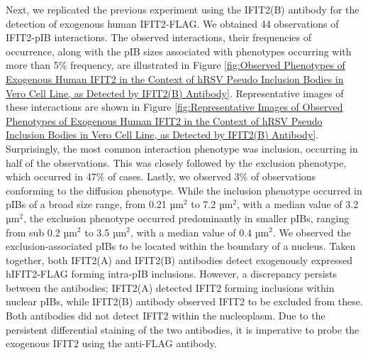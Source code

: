 Next, we replicated the previous experiment using the IFIT2(B) antibody for the detection of exogenous human IFIT2-FLAG. We obtained 44 observations of IFIT2-pIB interactions. The observed interactions, their frequencies of occurrence, along with the pIB sizes associated with phenotypes occurring with more than 5\% frequency, are illustrated in Figure \ref{fig:Observed Phenotypes of Exogenous Human IFIT2 in the Context of hRSV Pseudo Inclusion Bodies in Vero Cell Line, as Detected by IFIT2(B) Antibody}. Representative images of these interactions are shown in Figure \ref{fig:Representative Images of Observed Phenotypes of Exogenous Human IFIT2 in the Context of hRSV Pseudo Inclusion Bodies in Vero Cell Line, as Detected by IFIT2(B) Antibody}. Surprisingly, the most common interaction phenotype was inclusion, occurring in half of the observations. This was closely followed by the exclusion phenotype, which occurred in 47\% of cases. Lastly, we observed 3\% of observations conforming to the diffusion phenotype. While the inclusion phenotype occurred in pIBs of a broad size range, from 0.21 \(\mbox{µm}^2\) to 7.2 \(\mbox{µm}^2\), with a median value of 3.2 \(\mbox{µm}^2\), the exclusion phenotype occurred predominantly in smaller pIBs, ranging from sub 0.2 \(\mbox{µm}^2\) to 3.5 \(\mbox{µm}^2\), with a median value of 0.4 \(\mbox{µm}^2\). We observed the exclusion-associated pIBs to be located within the boundary of a nucleus. Taken together, both IFIT2(A) and IFIT2(B) antibodies detect exogenously expressed hIFIT2-FLAG forming intra-pIB inclusions. However, a discrepancy persists between the antibodies; IFIT2(A) detected IFIT2 forming inclusions within nuclear pIBs, while IFIT2(B) antibody observed IFIT2 to be excluded from these. Both antibodies did not detect IFIT2 within the nucleoplasm. Due to the persistent differential staining of the two antibodies, it is imperative to probe the exogenous IFIT2 using the anti-FLAG antibody.

